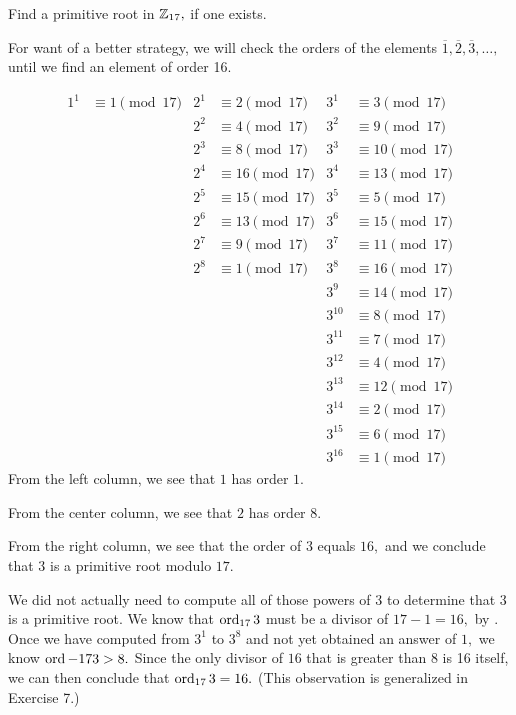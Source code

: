 \documentclass[letterpaper, 11 pt]{ximera}
\theoremstyle{definition}
\begin{document}
\begin{example}\label{ex:prime_roots_17}
    Find a primitive root in $\mathbb Z_{17},$ if one exists.

    
    \begin{solution}
        For want of a better strategy, we will check the orders of the elements $\overline{1},\overline{2},\overline{3},\dots,$ until we find an element of order 16.
        
        \begin{align*}
            1^1&\equiv 1\pmod{17} 
                &2^1&\equiv 2\pmod{17} 
                &3^1&\equiv 3\pmod{17}\\
            &   &2^2&\equiv 4\pmod{17} 
                &3^2&\equiv 9\pmod{17}\\
            &   &2^3&\equiv 8\pmod{17} 
                &3^3&\equiv 10\pmod{17}\\
            &   &2^4&\equiv 16\pmod{17} 
                &3^4&\equiv 13\pmod{17}\\
            &   &2^5&\equiv 15\pmod{17} 
                &3^5&\equiv 5\pmod{17}\\
            &   &2^6&\equiv 13\pmod{17} 
                &3^6&\equiv 15\pmod{17}\\
            &   &2^7&\equiv 9\pmod{17} 
                &3^7&\equiv 11\pmod{17}\\
            &   &2^8&\equiv 1\pmod{17} 
                &3^8&\equiv 16\pmod{17}\\
            &&& &3^9&\equiv 14\pmod{17}\\
            &&& &3^{10}&\equiv 8\pmod{17}\\
            &&& &3^{11}&\equiv 7\pmod{17}\\
            &&& &3^{12}&\equiv 4\pmod{17}\\
            &&& &3^{13}&\equiv 12\pmod{17}\\
            &&& &3^{14}&\equiv 2\pmod{17}\\
            &&& &3^{15}&\equiv 6\pmod{17}\\
            &&& &3^{16}&\equiv 1\pmod{17}
        \end{align*}
        From the left column, we see that $1$ has order $1.$

        From the center column, we see that $2$ has order $8.$

        From the right column, we see that the order of $3$ equals $16,$ and we conclude that $3$ is a primitive root modulo $17.$

        We did not actually need to compute all of those powers of $3$ to determine that $3$ is a primitive root. We know that $\operatorname{ord}_{17}3$ must be a divisor of $17-1=16,$ by . Once we have computed from $3^1$ to $3^8$ and not yet obtained an answer of $1,$ we know $\operatorname{ord}-{17}3>8.$ Since the only divisor of $16$ that is greater than $8$ is 16 itself, we can then conclude that $\operatorname{ord}_{17}3=16.$ (This observation is generalized in Exercise 7.)
    \end{solution}
\end{example}
\end{document}
